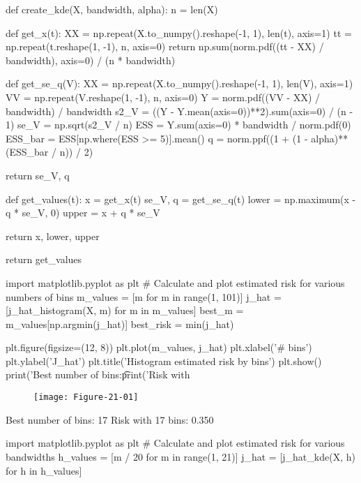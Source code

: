 \begin{python}
def create_kde(X, bandwidth, alpha):
    n = len(X)
    
    def get_x(t):
        XX = np.repeat(X.to_numpy().reshape(-1, 1), len(t), axis=1)
        tt = np.repeat(t.reshape(1, -1), n, axis=0)
        return np.sum(norm.pdf((tt - XX) / bandwidth), axis=0) / (n * bandwidth)
    
    def get_se_q(V):
        XX = np.repeat(X.to_numpy().reshape(-1, 1), len(V), axis=1)
        VV = np.repeat(V.reshape(1, -1), n, axis=0)
        Y = norm.pdf((VV - XX) / bandwidth) / bandwidth
        s2_V = ((Y - Y.mean(axis=0))**2).sum(axis=0) / (n - 1)
        se_V = np.sqrt(s2_V / n)
        ESS = Y.sum(axis=0) * bandwidth / norm.pdf(0)
        ESS_bar = ESS[np.where(ESS >= 5)].mean()
        q = norm.ppf((1 + (1 - alpha)**(ESS_bar / n)) / 2)
    
        return se_V, q
    
    def get_values(t):
        x = get_x(t)
        se_V, q = get_se_q(t)
        lower = np.maximum(x - q * se_V, 0)
        upper = x + q * se_V
        
        return x, lower, upper
        
    return get_values
\end{python}

\begin{python}
import matplotlib.pyplot as plt
# Calculate and plot estimated risk for various numbers of bins
m_values = [m for m in range(1, 101)]
j_hat = [j_hat_histogram(X, m) for m in m_values]
best_m = m_values[np.argmin(j_hat)]
best_risk = min(j_hat)
\end{python}

\begin{python}
plt.figure(figsize=(12, 8))
plt.plot(m_values, j_hat)
plt.xlabel('# bins')
plt.ylabel('J_hat')
plt.title('Histogram estimated risk by bins')
plt.show()
print('Best number of bins:\t%
print('Risk with %
\end{python}

\begin{figure}[H]
\centering
\texttt{[image: Figure-21-01]}
\end{figure}

\begin{console}
Best number of bins:    17
Risk with 17 bins:      0.350
\end{console}

\begin{python}
import matplotlib.pyplot as plt
# Calculate and plot estimated risk for various bandwidths
h_values = [m / 20 for m in range(1, 21)]
j_hat = [j_hat_kde(X, h) for h in h_values]
\end{python}

